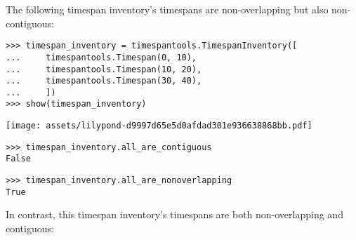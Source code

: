 \noindent The following timespan inventory's timespans are non-overlapping but
also non-contiguous:

\begin{comment}
<abjad>
timespan_inventory = timespantools.TimespanInventory([
    timespantools.Timespan(0, 10),
    timespantools.Timespan(10, 20),
    timespantools.Timespan(30, 40),
    ])
show(timespan_inventory)
timespan_inventory.all_are_contiguous
timespan_inventory.all_are_nonoverlapping
</abjad>
\end{comment}

\begin{abjadbookoutput}
\begin{singlespacing}
\vspace{-0.5\baselineskip}
\begin{verbatim}
>>> timespan_inventory = timespantools.TimespanInventory([
...     timespantools.Timespan(0, 10),
...     timespantools.Timespan(10, 20),
...     timespantools.Timespan(30, 40),
...     ])
>>> show(timespan_inventory)
\end{verbatim}
\noindent\texttt{[image: assets/lilypond-d9997d65e5d0afdad301e936638868bb.pdf]}
\begin{verbatim}
>>> timespan_inventory.all_are_contiguous
False
\end{verbatim}
\begin{verbatim}
>>> timespan_inventory.all_are_nonoverlapping
True
\end{verbatim}
\end{singlespacing}
\end{abjadbookoutput}

\noindent In contrast, this timespan inventory's timespans are both
non-overlapping and contiguous:

\begin{comment}
<abjad>
timespan_inventory = timespantools.TimespanInventory([
    timespantools.Timespan(0, 10),
    timespantools.Timespan(10, 20),
    timespantools.Timespan(20, 30),
    ])
show(timespan_inventory)
timespan_inventory.all_are_contiguous
timespan_inventory.all_are_nonoverlapping
</abjad>
\end{comment}

